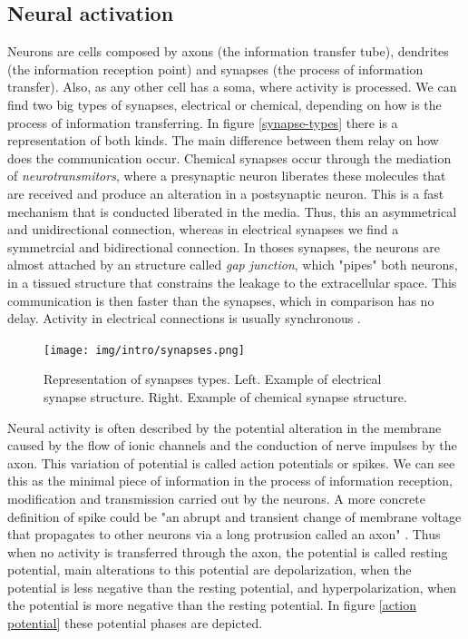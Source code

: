 \subsection{Neural activation}
Neurons are cells composed by axons (the information transfer tube), dendrites (the information reception point) and synapses (the process of information transfer). Also, as any other cell has a soma, where activity is processed. %
We can find two big types of synapses, electrical or chemical, depending on how is the process of information transferring. In figure \ref{synapse-types} there is a representation of both kinds. The main difference between them relay on how does the communication occur. Chemical synapses occur through the mediation of \textit{neurotransmitors}, where a presynaptic neuron liberates these molecules that are received and produce an alteration in a postsynaptic neuron. This is a fast mechanism that is conducted liberated in the media. Thus, this an asymmetrical and unidirectional connection, whereas in electrical synapses we find a symmetrcial and bidirectional connection. In thoses synapses, the neurons are almost attached by an structure called \textit{gap junction}, which "pipes" both neurons, in a tissued structure that constrains the leakage to the extracellular space. This communication is then faster than the synapses, which in comparison has no delay. Activity in electrical connections is usually synchronous \cite{levitan_neuron_2002}.

\begin{figure}[hbt!]
    \centering
    \texttt{[image: img/intro/synapses.png]}
    \caption{Representation of synapses types. Left. Example of electrical synapse structure. Right. Example of chemical synapse structure.}
    \label{fig:synapse-types}
\end{figure}

Neural activity is often described by the potential alteration in the membrane caused by the flow of ionic channels and the conduction of nerve impulses by the axon. This variation of potential is called action potentials or spikes. We can see this as the minimal piece of information in the process of information reception, modification and transmission carried out by the neurons. A more concrete definition of spike could be "an abrupt and transient change of membrane voltage that propagates to other neurons via a long protrusion called an axon" \cite{izhikevich_dynamical_2007}. Thus when no activity is transferred through the axon, the potential is called resting potential, main alterations to this potential are depolarization, when the potential is less negative than the resting potential, and hyperpolarization, when the potential is more negative than the resting potential. In figure \ref{action potential} these potential phases are depicted. 

